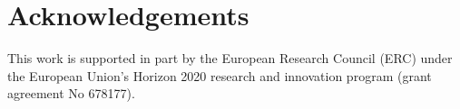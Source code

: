 \documentclass[orivec]{llncs}
\begin{document}





%



%



\section{Acknowledgements}

This work is supported in part by the European Research Council (ERC) under the European Union's Horizon 2020 research and innovation program (grant agreement No 678177). 




%
%
%
%
%
%
\end{document}
